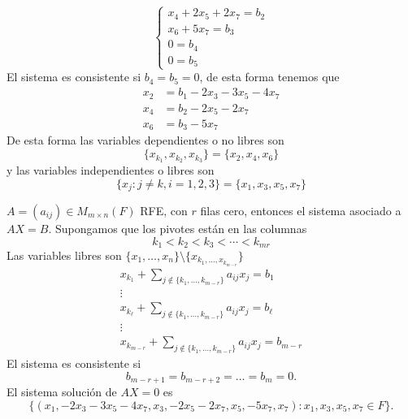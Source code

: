 \documentclass[12pt,a4paper]{book}
\begin{document}
\begin{ejemplo}
\begin{equation*}
\begin{cases}
                x_{4}+2x_{5}+2x_{7}=b_{2}\\
                x_{6}+5x_{7}=b_{3}\\
                0=b_{4}\\
                0=b_{5}
            \end{cases}
        \end{equation*}
        El sistema es consistente si $b_{4}=b_{5}=0$, de esta forma tenemos que
        \begin{align*}
            x_{2}&=b_{1}-2x_{3}-3x_{5}-4x_{7}\\
            x_{4}&=b_{2}-2x_{5}-2x_{7}\\
            x_{6}&=b_{3}-5x_{7}
        \end{align*}
        De esta forma las variables dependientes o no libres son
        \begin{equation*}
            \{x_{k_{1}},x_{k_{2}},x_{k_{3}}\}=\{x_{2},x_{4},x_{6}\}
        \end{equation*}
        y las variables independientes o libres son
        \begin{equation*}
            \{x_{j}:j\neq k,i=1,2,3\}=\{x_{1},x_{3},x_{5},x_{7}\}
        \end{equation*}
    \end{ejemplo}
    $A=(a_{ij})\in M_{m\times n}(F)$ RFE, con $r$ filas cero, entonces el sistema asociado a $AX=B$. Supongamos que los pivotes están en las columnas
    \begin{equation*}
        k_{1}\lt k_{2}\lt k_{3}\lt\cdots\lt k_{mr}
    \end{equation*}
    Las variables libres son $\{x_{1},\dots,x_{n}\}\setminus\{x_{k_{1},\dots,x_{k_{m-r}}}\}$
    \begin{equation*}
        \begin{matrix}
            x_{k_{1}}+\sum_{j\notin\{k_{1},\dots,k_{m-r}\}}a_{ij}x_{j}=b_{1}\\
            \vdots\\
            x_{k_{\ell}}+\sum_{j\notin\{k_{1},\dots,k_{m-r}\}}a_{ij}x_{j}=b_{\ell}\\
            \vdots\\
            x_{k_{m-r}}+\sum_{j\notin\{k_{1},\dots,k_{m-r}\}}a_{ij}x_{j}=b_{m-r}
        \end{matrix}
    \end{equation*}
    El sistema es consistente si
    \begin{equation*}
        b_{m-r+1}=b_{m-r+2}=\dots=b_{m}=0.
    \end{equation*}
    El sistema solución de $AX=0$ es
    \begin{equation*}
        \{(x_{1},-2x_{3}-3x_{5}-4x_{7},x_{3},-2x_{5}-2x_{7},x_{5},-5x_{7},x_{7}):x_{1},x_{3},x_{5},x_{7}\in F\}.
    \end{equation*}
\end{document}
